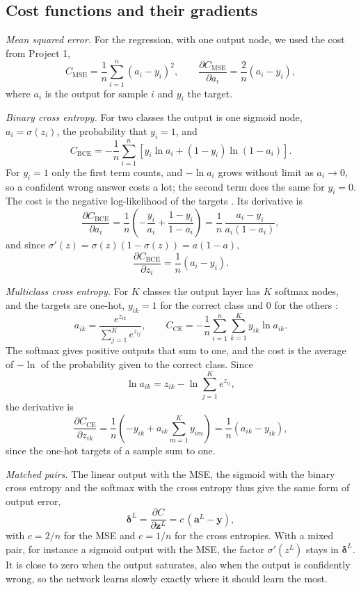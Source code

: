 \subsection*{Cost functions and their gradients}

\emph{Mean squared error.} For the regression, with one output node, we used the cost from Project 1,
$$
C_{\mathrm{MSE}} = \frac{1}{n}\sum_{i=1}^{n}(a_i - y_i)^2, \qquad \frac{\partial C_{\mathrm{MSE}}}{\partial a_i} = \frac{2}{n}(a_i - y_i),
$$
where $a_i$ is the output for sample $i$ and $y_i$ the target.

\emph{Binary cross entropy.} For two classes the output is one sigmoid node, $a_i = \sigma(z_i)$, the probability that $y_i = 1$, and
$$
C_{\mathrm{BCE}} = -\frac{1}{n}\sum_{i=1}^{n}\left[y_i\ln a_i + (1 - y_i)\ln(1 - a_i)\right].
$$
For $y_i = 1$ only the first term counts, and $-\ln a_i$ grows without limit as $a_i \to 0$, so a confident wrong answer costs a lot; the second term does the same for $y_i = 0$. The cost is the negative log-likelihood of the targets \cite[Sec.~5.3]{HjorthJensen2026}. Its derivative is
$$
\frac{\partial C_{\mathrm{BCE}}}{\partial a_i} = \frac{1}{n}\left(-\frac{y_i}{a_i} + \frac{1 - y_i}{1 - a_i}\right) = \frac{1}{n}\,\frac{a_i - y_i}{a_i(1 - a_i)},
$$
and since $\sigma'(z) = \sigma(z)\left(1 - \sigma(z)\right) = a(1 - a)$,
$$
\frac{\partial C_{\mathrm{BCE}}}{\partial z_i} = \frac{1}{n}(a_i - y_i).
$$

\emph{Multiclass cross entropy.} For $K$ classes the output layer has $K$ softmax nodes, and the targets are one-hot, $y_{ik} = 1$ for the correct class and 0 for the others \cite[Sec.~5.6]{HjorthJensen2026}:
$$
a_{ik} = \frac{e^{z_{ik}}}{\sum_{j=1}^{K} e^{z_{ij}}}, \qquad C_{\mathrm{CE}} = -\frac{1}{n}\sum_{i=1}^{n}\sum_{k=1}^{K} y_{ik}\ln a_{ik}.
$$
The softmax gives positive outputs that sum to one, and the cost is the average of $-\ln$ of the probability given to the correct class. Since
$$
\ln a_{ik} = z_{ik} - \ln\sum_{j=1}^{K} e^{z_{ij}},
$$
the derivative is
$$
\frac{\partial C_{\mathrm{CE}}}{\partial z_{ik}} = \frac{1}{n}\left(-y_{ik} + a_{ik}\sum_{m=1}^{K} y_{im}\right) = \frac{1}{n}(a_{ik} - y_{ik}),
$$
since the one-hot targets of a sample sum to one.

\emph{Matched pairs.} The linear output with the MSE, the sigmoid with the binary cross entropy and the softmax with the cross entropy thus give the same form of output error,
$$
\boldsymbol{\delta}^L = \frac{\partial C}{\partial \mathbf{z}^L} = c\,(\mathbf{a}^L - \mathbf{y}),
$$
with $c = 2/n$ for the MSE and $c = 1/n$ for the cross entropies. With a mixed pair, for instance a sigmoid output with the MSE, the factor $\sigma'(z^L)$ stays in $\boldsymbol{\delta}^L$. It is close to zero when the output saturates, also when the output is confidently wrong, so the network learns slowly exactly where it should learn the most.

